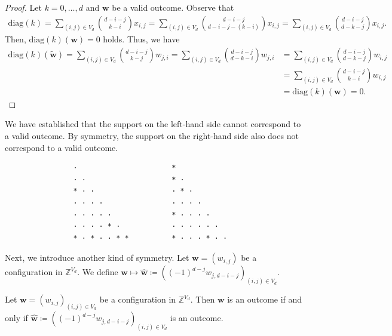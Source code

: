 \begin{proof}
    Let \(  k = 0, \dots, d \) and \(\mathbf{w} \) be a valid outcome.
    Observe that
    \begin{align*}
        \mathrm{diag}(k)  = \sum_{(i,j) \in V_d}\binom{d - i - j}{k-i} x_{i,j}
        = \sum_{(i,j) \in V_d}\binom{d - i - j}{d-i-j-(k-i)} x_{i,j}
        = \sum_{(i,j) \in V_d}\binom{d - i - j}{d-k-j} x_{i,j}.
    \end{align*}
    Then, \( \mathrm{diag}(k)(\mathbf{w}) = 0 \) holds. Thus, we have
    \begin{align*}
        \mathrm{diag}(k)(\tilde{\mathbf{w}}) = \sum_{(i,j) \in V_d}\binom{d - i - j}{k-j} w_{j,i}
        = \sum_{(i,j) \in V_d}\binom{d - i - j}{d-k-i} w_{j,i}
        &= \sum_{(i,j) \in V_d}\binom{d - i - j}{d-k-j} w_{i,j} \\
        &= \sum_{(i,j) \in V_d}\binom{d - i - j}{k-i} w_{i,j} \\
        &= \mathrm{diag}(k)(\mathbf w) = 0.
    \end{align*}
\end{proof}

\begin{example}
    We have established that the support on the left-hand side cannot correspond to a valid outcome. By symmetry, the support on the right-hand side also does not correspond to a valid outcome.
    \begin{verbatim}
                ·                      *
                · ·                    * ·
                * · ·                  · * · 
                · · · ·                · · · · 
                · · · · ·              * · · · · 
                · · · · * ·            · · · · · ·
                * · * · · * *          * · · · * · ·
    \end{verbatim}
\end{example}

Next, we introduce another kind of symmetry. Let \( \mathbf{w} = (w_{i,j}) \) be a configuration in \( \mathbb{Z}^{V_d} \). We define \( \mathbf w \mapsto \hat{\mathbf w} \coloneqq \left( (-1)^{d-j} w_{j, d - i -j} \right)_{(i,j) \in V_d} \).

\begin{proposition}\label{prop:symmetry-2}
    Let \( \mathbf{w} = (w_{i,j})_{(i,j) \in V_d} \) be a configuration in \( \mathbb{Z}^{V_d} \). Then \( \mathbf{w} \) is an outcome if and only if \( \hat{\mathbf w} \coloneqq \left( (-1)^{d-j} w_{j, d - i -j} \right)_{(i,j) \in V_d} \) is an outcome.
\end{proposition}


